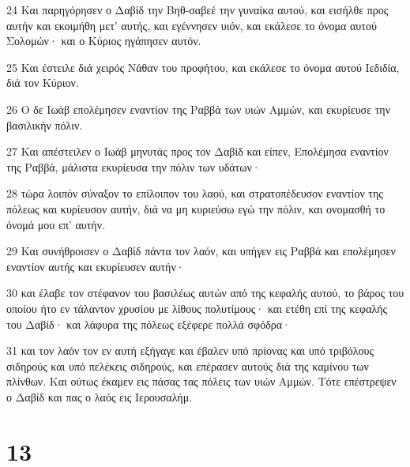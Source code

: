 \par 24 Και παρηγόρησεν ο Δαβίδ την Βηθ-σαβεέ την γυναίκα αυτού, και εισήλθε προς αυτήν και εκοιμήθη μετ' αυτής, και εγέννησεν υιόν, και εκάλεσε το όνομα αυτού Σολομών· και ο Κύριος ηγάπησεν αυτόν.
\par 25 Και έστειλε διά χειρός Νάθαν του προφήτου, και εκάλεσε το όνομα αυτού Ιεδιδία, διά τον Κύριον.
\par 26 Ο δε Ιωάβ επολέμησεν εναντίον της Ραββά των υιών Αμμών, και εκυρίευσε την βασιλικήν πόλιν.
\par 27 Και απέστειλεν ο Ιωάβ μηνυτάς προς τον Δαβίδ και είπεν, Επολέμησα εναντίον της Ραββά, μάλιστα εκυρίευσα την πόλιν των υδάτων·
\par 28 τώρα λοιπόν σύναξον το επίλοιπον του λαού, και στρατοπέδευσον εναντίον της πόλεως και κυρίευσον αυτήν, διά να μη κυριεύσω εγώ την πόλιν, και ονομασθή το όνομά μου επ' αυτήν.
\par 29 Και συνήθροισεν ο Δαβίδ πάντα τον λαόν, και υπήγεν εις Ραββά και επολέμησεν εναντίον αυτής και εκυρίευσεν αυτήν·
\par 30 και έλαβε τον στέφανον του βασιλέως αυτών από της κεφαλής αυτού, το βάρος του οποίου ήτο εν τάλαντον χρυσίου με λίθους πολυτίμους· και ετέθη επί της κεφαλής του Δαβίδ· και λάφυρα της πόλεως εξέφερε πολλά σφόδρα·
\par 31 και τον λαόν τον εν αυτή εξήγαγε και έβαλεν υπό πρίονας και υπό τριβόλους σιδηρούς και υπό πελέκεις σιδηρούς, και επέρασεν αυτούς διά της καμίνου των πλίνθων. Και ούτως έκαμεν εις πάσας τας πόλεις των υιών Αμμών. Τότε επέστρεψεν ο Δαβίδ και πας ο λαός εις Ιερουσαλήμ.

\chapter{13}

